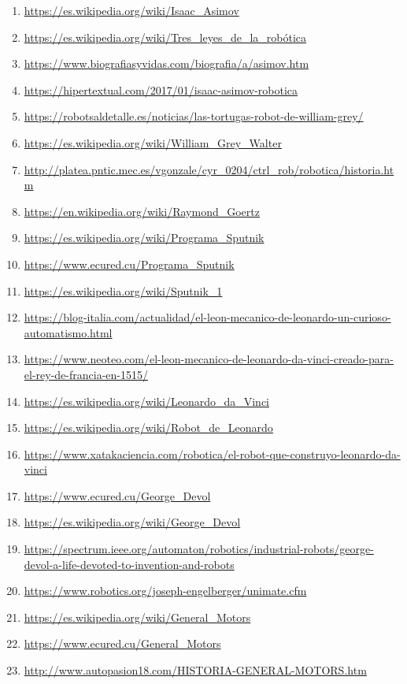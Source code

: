 \begin{enumerate}
\item\url{https://es.wikipedia.org/wiki/Isaac\_Asimov}
\item\url{https://es.wikipedia.org/wiki/Tres\_leyes\_de\_la\_robótica}
\item\url{https://www.biografiasyvidas.com/biografia/a/asimov.htm}
\item\url{https://hipertextual.com/2017/01/isaac-asimov-robotica}

\item\url{https://robotsaldetalle.es/noticias/las-tortugas-robot-de-william-grey/}
\item\url{https://es.wikipedia.org/wiki/William\_Grey\_Walter}

\item\url{http://platea.pntic.mec.es/vgonzale/cyr\_0204/ctrl\_rob/robotica/historia.htm}
\item\url{https://en.wikipedia.org/wiki/Raymond\_Goertz}

\item\url{https://es.wikipedia.org/wiki/Programa\_Sputnik}
\item\url{https://www.ecured.cu/Programa\_Sputnik}
\item\url{https://es.wikipedia.org/wiki/Sputnik\_1}



\item\url{https://blog-italia.com/actualidad/el-leon-mecanico-de-leonardo-un-curioso-automatismo.html}
\item\url{https://www.neoteo.com/el-leon-mecanico-de-leonardo-da-vinci-creado-para-el-rey-de-francia-en-1515/}
\item\url{https://es.wikipedia.org/wiki/Leonardo\_da\_Vinci}
\item\url{https://es.wikipedia.org/wiki/Robot\_de\_Leonardo}
\item\url{https://www.xatakaciencia.com/robotica/el-robot-que-construyo-leonardo-da-vinci}


\item\url{https://www.ecured.cu/George\_Devol}
\item\url{https://es.wikipedia.org/wiki/George\_Devol}
\item\url{https://spectrum.ieee.org/automaton/robotics/industrial-robots/george-devol-a-life-devoted-to-invention-and-robots}
\item\url{https://www.robotics.org/joseph-engelberger/unimate.cfm}

\item\url{https://es.wikipedia.org/wiki/General\_Motors}
\item\url{https://www.ecured.cu/General\_Motors}
\item\url{http://www.autopasion18.com/HISTORIA-GENERAL-MOTORS.htm}

\end{enumerate}


